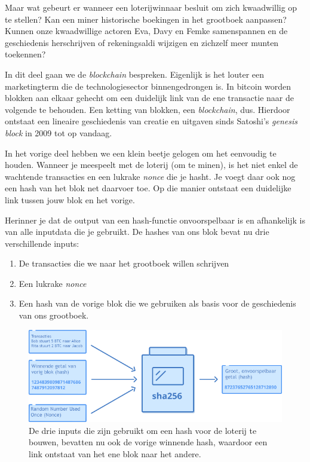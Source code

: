 \documentclass[
  letterpaper,
]{scrbook}
\begin{document}
Maar wat gebeurt er wanneer een loterijwinnaar besluit om zich
kwaadwillig op te stellen? Kan een miner historische boekingen in het
grootboek aanpassen? Kunnen onze kwaadwillige actoren Eva, Davy en Femke
samenspannen en de geschiedenis herschrijven of rekeningsaldi wijzigen
en zichzelf meer munten toekennen?

In dit deel gaan we de \emph{blockchain} bespreken. Eigenlijk is het
louter een marketingterm die de technologiesector binnengedrongen is. In
bitcoin worden blokken aan elkaar gehecht om een duidelijk link van de
ene transactie naar de volgende te behouden. Een ketting van blokken,
een \emph{blockchain}, dus. Hierdoor ontstaat een lineaire geschiedenis
van creatie en uitgaven sinds Satoshi's \emph{genesis block} in 2009 tot
op vandaag.

In het vorige deel hebben we een klein beetje gelogen om het eenvoudig
te houden. Wanneer je meespeelt met de loterij (om te minen), is het
niet enkel de wachtende transacties en een lukrake \emph{nonce} die je
hasht. Je voegt daar ook nog een hash van het blok net daarvoer toe. Op
die manier ontstaat een duidelijke link tussen jouw blok en het vorige.

Herinner je dat de output van een hash-functie onvoorspelbaar is en
afhankelijk is van alle inputdata die je gebruikt. De hashes van ons
blok bevat nu drie verschillende inputs:

\begin{enumerate}
\def\labelenumi{\arabic{enumi}.}
\item
  De transacties die we naar het grootboek willen schrijven
\item
  Een lukrake \emph{nonce}
\item
  Een hash van de vorige blok die we gebruiken als basis voor de
  geschiedenis van ons grootboek.
\end{enumerate}

\begin{figure}

{\centering \includegraphics{./images/fig11.png}

}

\caption{\label{fig-figuur11}De drie inputs die zijn gebruikt om een
hash voor de loterij te bouwen, bevatten nu ook de vorige winnende hash,
waardoor een link ontstaat van het ene blok naar het andere.}

\end{figure}
\end{document}
